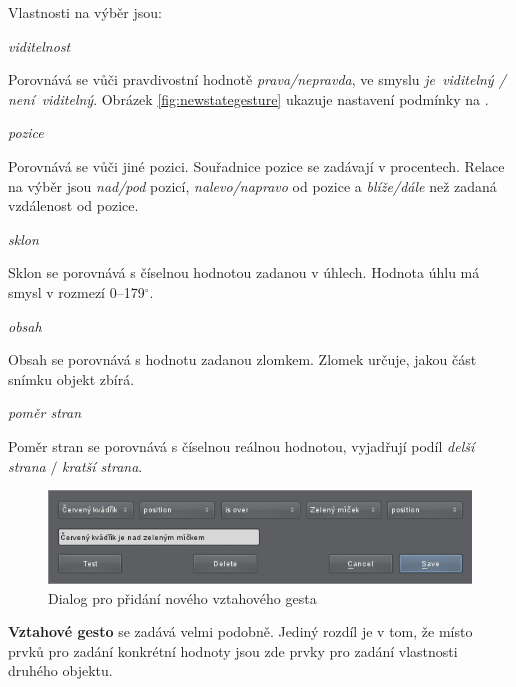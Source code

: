 Vlastnosti na výběr jsou:
\begin{itemize_compact}
    \item \emph{viditelnost}
    
    Porovnává se vůči pravdivostní hodnotě \emph{prava/nepravda}, ve smyslu
    \emph{je~viditelný / není~viditelný}. Obrázek \ref{fig:newstategesture}
    ukazuje nastavení podmínky na .

    \item \emph{pozice}

    Porovnává se vůči jiné pozici. Souřadnice pozice se zadávají v procentech.
    Relace na výběr jsou \emph{nad/pod} pozicí, \emph{nalevo/napravo}
    od pozice a \emph{blíže/dále} než zadaná vzdálenost od pozice.

    \item \emph{sklon}\nopagebreak

    Sklon se porovnává s číselnou hodnotou zadanou v úhlech. Hodnota úhlu má
    smysl v rozmezí 0--179$^{\circ}$.

    \item \emph{obsah}

    Obsah se porovnává s hodnotu zadanou zlomkem. Zlomek určuje, jakou část
    snímku objekt zbírá.

    \item \emph{poměr stran}

    Poměr stran se porovnává s číselnou reálnou hodnotou, vyjadřují podíl
    \emph{delší strana} $/$ \emph{kratší strana}.
\end{itemize_compact}

\begin{figure}[h]
\centering
\includegraphics[width=1.1\textwidth]{newrelationgesture.png}
\caption{Dialog pro přidání nového vztahového gesta}
\label{fig:newrelationgesture}
\end{figure}

\textbf{Vztahové gesto} se zadává velmi podobně. Jediný rozdíl je v tom, že
místo prvků pro zadání konkrétní hodnoty jsou zde prvky pro zadání vlastnosti
druhého objektu.


